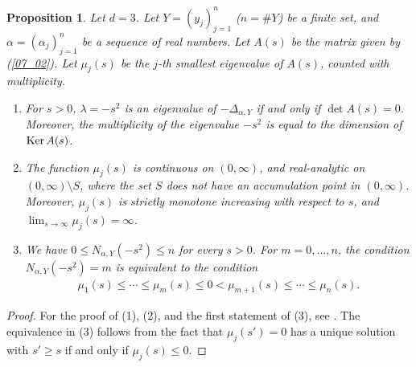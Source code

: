 \documentclass[12pt,a4paper]{article}
\newtheorem{proposition}[theorem]{Proposition}
\def\Ker{\mathop{\rm Ker}\nolimits}
\begin{document}
\begin{proposition}
\label{prop_al}
Let $d=3$.
Let 
$Y=(y_j)_{j=1}^n$ ($n=\#Y$) be a finite set,
and $\alpha=(\alpha_j)_{j=1}^n$ be a sequence of real numbers.
Let $A(s)$ be the matrix given by (\ref{07_02}).
Let $\mu_j(s)$ be the $j$-th smallest eigenvalue of $A(s)$,
counted with multiplicity.


\begin{enumerate}
 \item[(1)]
For $s>0$,
$\lambda =-s^2$ is an eigenvalue of $-\Delta_{\alpha,Y}$ if 
and only if $\det A(s)=0$.
Moreover, the multiplicity of the eigenvalue $-s^2$ is
equal to the dimension of $\Ker A(s)$.

 \item[(2)]
The function $\mu_j(s)$ is continuous on $(0,\infty)$,
and real-analytic on $(0,\infty)\setminus S$,
where the set $S$ does not have an accumulation point in 
$(0,\infty)$.
Moreover,
$\mu_j(s)$ is strictly monotone increasing with respect to $s$,
and 
$\displaystyle \lim_{s\to \infty} \mu_j(s)=\infty$.


 \item[(3)]
We have $0\leq N_{\alpha,Y}(-s^2)\leq n$ for every $s>0$.
For $m=0,\ldots, n$,
the condition $N_{\alpha,Y}(-s^2)=m$ 
is equivalent to the condition
\begin{align*}
 \mu_1(s) \leq \cdots \leq \mu_m(s) \leq 0 
< \mu_{m+1}(s)\leq \cdots \leq \mu_n(s).
\end{align*}
\end{enumerate}
\end{proposition}
\noindent
\begin{proof}
For the proof of (1), (2), and the first statement 
of (3),
see \cite[Theorem II-1.1.4]{Al-Ge-Ho-Ho}.
The equivalence in (3) follows from the fact
that $\mu_j(s')=0$ has a unique solution with $s'\geq s$
if and only if $\mu_j(s)\leq 0$.
\end{proof}
\end{document}
